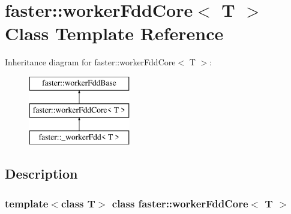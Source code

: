 \hypertarget{classfaster_1_1workerFddCore}{}\section{faster\+:\+:worker\+Fdd\+Core$<$ T $>$ Class Template Reference}
\label{classfaster_1_1workerFddCore}
Inheritance diagram for faster\+:\+:worker\+Fdd\+Core$<$ T $>$\+:\begin{figure}[H]
\begin{center}
\leavevmode
\includegraphics[height=3.000000cm]{classfaster_1_1workerFddCore}
\end{center}
\end{figure}


\subsection{Description}
\subsubsection*{template$<$class T$>$\newline
class faster\+::worker\+Fdd\+Core$<$ T $>$}

